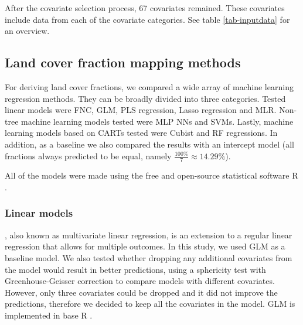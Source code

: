 \documentclass[review,authoryear,3p]{elsarticle}
\begin{document}
After the covariate selection process, 67 covariates remained.
These covariates include data from each of the covariate categories.
See table \ref{tab-inputdata} for an overview.


\subsection{Land cover fraction mapping methods}

For deriving land cover fractions, we compared a wide array of machine learning regression methods.
They can be broadly divided into three categories.
Tested linear models were \ac{FNC}, \ac{GLM}, \ac{PLS} regression, Lasso regression and \ac{MLR}.
Non-tree machine learning models tested were \ac{MLP} \glspl{NN} and \glspl{SVM}.
Lastly, machine learning models based on \glspl{CART} tested were Cubist and \ac{RF} regressions.
In addition, as a baseline we also compared the results with an intercept model (all fractions always predicted to be equal, namely $\frac{100\%}{7}\approx14.29\%$).

All of the models were made using the free and open-source statistical software R \citep{r_2019}.

\subsubsection{Linear models}

, also known as multivariate linear regression, is an extension to a regular linear regression that allows for multiple outcomes.
In this study, we used \gls{GLM} as a baseline model.
We also tested whether dropping any additional covariates from the model would result in better predictions, using a sphericity test with Greenhouse-Geisser correction to compare models with different covariates.
However, only three covariates could be dropped and it did not improve the predictions, therefore we decided to keep all the covariates in the model.
\Gls{GLM} is implemented in base R \citep{r_2019}.
\end{document}
